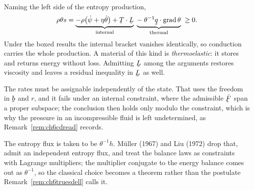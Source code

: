 {\begin{readernote}
Naming the left side of  the entropy production,
\[
   \rho\theta s
   =\underbrace{-\rho\big(\dot\psi+\eta\dot\theta\big)
     +\bT\cdot\bL}_{\text{internal}}
   \;\underbrace{-\;\theta^{-1}\ip\bq{\grad\theta}}_{\text{thermal}}
   \;\geq0 .
\]
Under the boxed results the internal bracket vanishes identically, so
conduction carries the whole production. A material of this kind is
\emph{thermoelastic}: it stores and returns energy without loss.
Admitting $\bL$ among the arguments restores viscosity and leaves a
residual inequality in $\bL$ as well.

The rates must be assignable independently of the state. That uses the
freedom in $\bb$ and $r$, and it fails under an internal constraint,
where the admissible $\dot\bF$ span a proper subspace; the conclusion
then holds only modulo the constraint, which is why the pressure in an
incompressible fluid is left undetermined, as
Remark~\ref{rem:ch6cdread} records.

The entropy flux is taken to be $\theta^{-1}h$. M\"uller (1967) and Liu
(1972) drop that, admit an independent entropy flux, and treat the
balance laws as constraints with Lagrange multipliers; the multiplier
conjugate to the energy balance comes out as $\theta^{-1}$, so the
classical choice becomes a theorem rather than the postulate
Remark~\ref{rem:ch6truesdell} calls it.
\end{readernote}%
}
